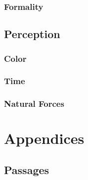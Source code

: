 \documentclass[openany, 12pt, b5paper, draft]{memoir}
\begin{document}
\section{Formality}
\chapter{Perception}
\section{Color}
\section{Time}
\section{Natural Forces}

\part{Appendices}
\appendix

\chapter{Passages}
\backmatter
\end{document}

